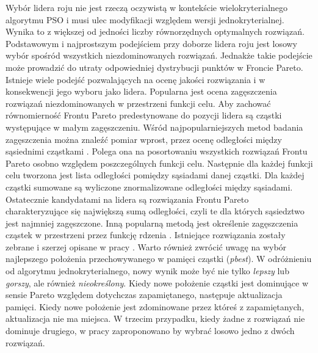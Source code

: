 Wybór lidera roju nie jest rzeczą oczywistą w kontekście wielokryterialnego algorytmu PSO i musi ulec modyfikacji względem wersji jednokryterialnej. Wynika to z większej od jedności liczby równorzędnych optymalnych rozwiązań. Podstawowym i najprostszym podejściem przy doborze lidera roju jest losowy wybór spośród wszystkich niezdominowanych rozwiązań. Jednakże takie podejście może prowadzić do utraty odpowiedniej dystrybucji punktów w Froncie Pareto. Istnieje wiele podejść pozwalających na ocenę jakości rozwiązania i w konsekwencji jego wyboru jako lidera. Popularna jest ocena zagęszczenia rozwiązań niezdominowanych w przestrzeni funkcji celu. Aby zachować równomierność Frontu Pareto predestynowane do pozycji lidera są cząstki występujące w małym zagęszczeniu. Wśród najpopularniejszych metod badania zagęszczenia można znaleźć pomiar wprost, przez ocenę odległości między sąsiednimi cząstkami \parencite{Deb2002}. Polega ona na posortowaniu wszystkich rozwiązań Frontu Pareto osobno względem poszczególnych funkcji celu. Następnie dla każdej funkcji celu tworzona jest lista odległości pomiędzy sąsiadami danej cząstki. Dla każdej cząstki sumowane są wyliczone znormalizowane odległości między sąsiadami. Ostatecznie kandydatami na lidera są rozwiązania Frontu Pareto charakteryzujące się największą sumą odległości, czyli te dla których sąsiedztwo jest najmniej zagęszczone. Inną popularną metodą jest określenie zagęszczenia cząstek w przestrzeni przez funkcję rdzenia \parencite{Deb1989}. Istniejące rozwiązania zostały zebrane i szerzej opisane w pracy \parencite{CoelloCoello2006}. Warto również zwrócić uwagę na wybór najlepszego położenia przechowywanego w pamięci cząstki  (\textit{pbest}). W odróżnieniu od algorytmu jednokryterialnego, nowy wynik może być nie tylko \textit{lepszy} lub \textit{gorszy}, ale również \textit{nieokreślony}. Kiedy nowe położenie cząstki jest dominujące w sensie Pareto względem dotychczas zapamiętanego, następuje aktualizacja pamięci. Kiedy nowe położenie jest zdominowane przez któreś z zapamiętanych, aktualizacja nie ma miejsca. W trzecim przypadku, kiedy żadne z rozwiązań nie dominuje drugiego, w pracy \cite{CoelloCoello2002} zaproponowano by wybrać losowo jedno z dwóch rozwiązań.

